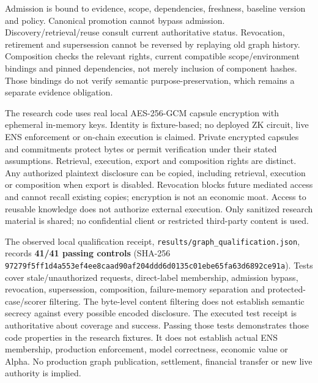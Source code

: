 \documentclass[
  10pt,
]{article}
\begin{document}
Admission is bound to evidence, scope, dependencies, freshness, baseline
version and policy. Canonical promotion cannot bypass admission.
Discovery/retrieval/reuse consult current authoritative status.
Revocation, retirement and supersession cannot be reversed by replaying
old graph history. Composition checks the relevant rights, current
compatible scope/environment bindings and pinned dependencies, not
merely inclusion of component hashes. Those bindings do not verify
semantic purpose-preservation, which remains a separate evidence
obligation.

The research code uses real local AES-256-GCM capsule encryption with
ephemeral in-memory keys. Identity is fixture-based; no deployed ZK
circuit, live ENS enforcement or on-chain execution is claimed. Private
encrypted capsules and commitments protect bytes or permit verification
under their stated assumptions. Retrieval, execution, export and
composition rights are distinct. Any authorized plaintext disclosure can
be copied, including retrieval, execution or composition when export is
disabled. Revocation blocks future mediated access and cannot recall
existing copies; encryption is not an economic moat. Access to reusable
knowledge does not authorize external execution. Only sanitized research
material is shared; no confidential client or restricted third-party
content is used.

The observed local qualification receipt,
\nolinkurl{results/graph_qualification.json}, records \textbf{41/41
passing controls} (SHA-256
\nolinkurl{97279f5ff1d4a553ef4ee8caad90af204ddd6d0135c01ebe65fa63d6892ce91a}).
Tests cover stale/unauthorized requests, direct-label membership,
admission bypass, revocation, supersession, composition, failure-memory
separation and protected-case/scorer filtering. The byte-level content
filtering does not establish semantic secrecy against every possible
encoded disclosure. The executed test receipt is authoritative about
coverage and success. Passing those tests demonstrates those code
properties in the research fixtures. It does not establish actual ENS
membership, production enforcement, model correctness, economic value or
Alpha. No production graph publication, settlement, financial transfer
or new live authority is implied.
\end{document}
